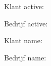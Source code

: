\documentclass{article}
\begin{document}
Klant active: \par
Bedrijf active: \par
Klant name: \par
Bedrijf name: \par
\end{document}
